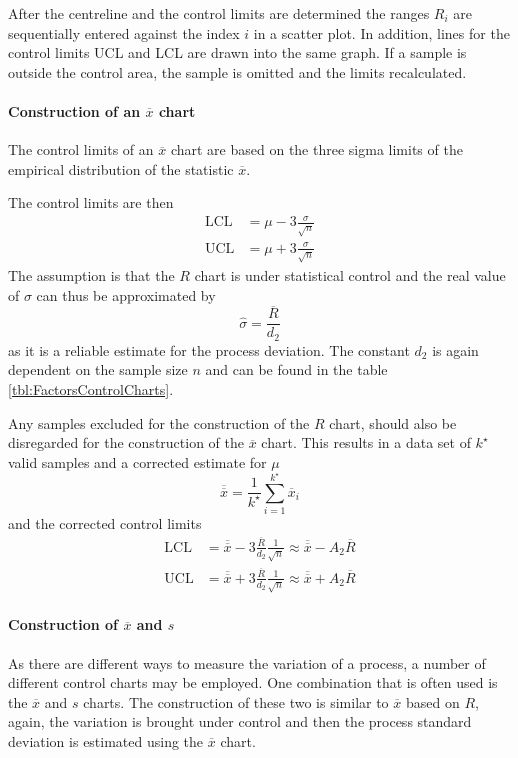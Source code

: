 \documentclass[11pt]{article}
\theoremstyle{definition}
\newcommand*\samplemean[1]{\overline{#1}}
\begin{document}
After the centreline and the control limits are determined the ranges $R_i$ are sequentially entered against the index $i$ in a scatter plot. In addition, lines for the control limits UCL and LCL are drawn into the same graph. If a sample is outside the control area, the sample is omitted and the limits recalculated.

\paragraph{Construction of an $\samplemean{x}$ chart} The control limits of an $\samplemean{x}$ chart are based on the three sigma limits of the empirical distribution of the statistic $\samplemean{x}$.

The control limits are then
\begin{align}
	\text{LCL} &= \mu - 3 \frac{\sigma}{\sqrt{n}}\\
	\text{UCL} &= \mu + 3 \frac{\sigma}{\sqrt{n}}
\end{align}
The assumption is that the $R$ chart is under statistical control and the real value of $\sigma$ can thus be approximated by
\begin{equation*}
	\hat{\sigma} = \frac{\samplemean{R}}{d_2}
\end{equation*}
as it is a reliable estimate for the process deviation. The constant $d_2$ is again dependent on the sample size $n$ and can be found in the table \ref{tbl:FactorsControlCharts}.

Any samples excluded for the construction of the $R$ chart, should also be disregarded for the construction of the $\samplemean{x}$ chart. This results in a data set of $k^\star$ valid samples and a corrected estimate for $\mu$
\begin{equation*}
	\samplemean{\samplemean{x}} = \frac{1}{k^\star}\sum_{i=1}^{k^\star}\samplemean{x}_i
\end{equation*}
and the corrected control limits
\begin{align*}
	\text{LCL} &= \samplemean{\samplemean{x}} - 3 \frac{\samplemean{R}}{d_2}\frac{1}{\sqrt{n}} \approx \samplemean{\samplemean{x}} - A_2\samplemean{R} \\
	\text{UCL} &= \samplemean{\samplemean{x}} + 3 \frac{\samplemean{R}}{d_2}\frac{1}{\sqrt{n}} \approx \samplemean{\samplemean{x}} + A_2\samplemean{R}
\end{align*}

\paragraph{Construction of $\samplemean{x}$ and $s$} As there are different ways to measure the variation of a process, a number of different control charts may be employed. One combination that is often used is the $\samplemean{x}$ and $s$ charts. The construction of these two is similar to $\samplemean{x}$ based on $R$, again, the variation is brought under control and then the process standard deviation is estimated using the $\samplemean{x}$ chart.
\end{document}
